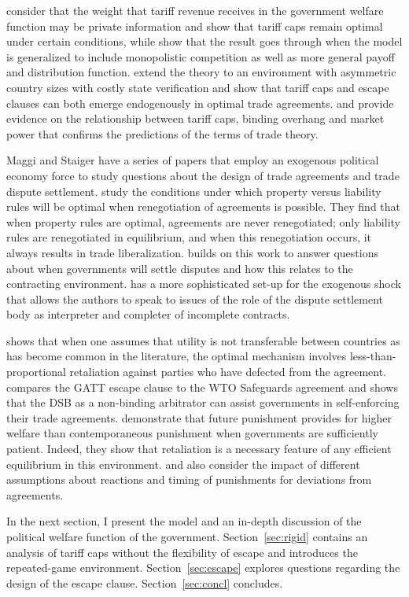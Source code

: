 \Textcite{ab2012} consider that the weight that tariff revenue receives in the government welfare function may be private information and show that tariff caps remain optimal under certain conditions, while \Textcite{ab2013} show that the result goes through when the \Textcite{bs2005} model is generalized to include monopolistic competition as well as more general payoff and distribution function. \Textcite{bb} extend the theory to an environment with asymmetric country sizes with costly state verification and show that tariff caps and escape clauses can both emerge endogenously in optimal trade agreements. \Textcite{bbr} and \Textcite{nos} provide evidence on the relationship between tariff caps, binding overhang and market power that confirms the predictions of the terms of trade theory.

Maggi and Staiger have a series of papers that employ an exogenous political economy force to study questions about the design of trade agreements and trade dispute settlement. \Textcite{ms2012a} study the conditions under which property versus liability rules will be optimal when renegotiation of agreements is possible. They find that when property rules are optimal, agreements are never renegotiated; only liability rules are renegotiated in equilibrium, and when this renegotiation occurs, it always results in trade liberalization. \Textcite{ms2013} builds on this work to answer questions about when governments will settle disputes and how this relates to the contracting environment. \Textcite{ms2011} has a more sophisticated set-up for the exogenous shock that allows the authors to speak to issues of the role of the dispute settlement body as interpreter and completer of incomplete contracts.
		
\Textcite{beshkar2010a} shows that when one assumes that utility is not transferable between countries as has become common in the literature, the optimal mechanism involves less-than-proportional retaliation against parties who have defected from the agreement. \Textcite{beshkar2010b} compares the GATT escape clause to the WTO Safeguards agreement and shows that the DSB as a non-binding arbitrator can assist governments in self-enforcing their trade agreements. \Textcite{martinvergote} demonstrate that future punishment provides for higher welfare than contemporaneous punishment when governments are sufficiently patient. Indeed, they show that retaliation is a necessary feature of any efficient equilibrium in this environment. \Textcite{hungerford} and \Textcite{riezman1991} also consider the impact of different assumptions about reactions and timing of punishments for deviations from agreements.



In the next section, I present the model and an in-depth discussion of the political welfare function of the government. Section~\ref{sec:rigid} contains an analysis of tariff caps without the flexibility of escape and introduces the repeated-game environment. Section~\ref{sec:escape} explores questions regarding the design of the escape clause. Section~\ref{sec:concl} concludes.